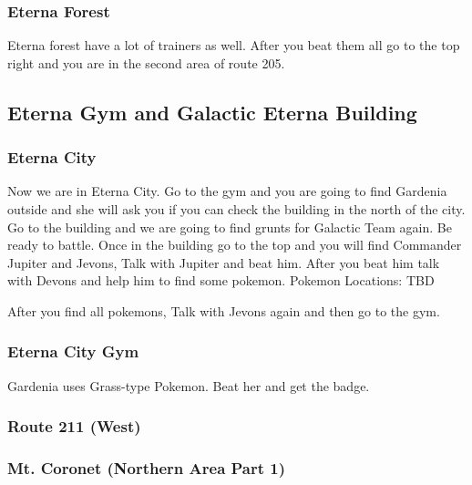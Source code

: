 \documentclass[11pt]{article}
\begin{document}




\subsubsection{Eterna Forest}\label{subsubsec:eterna_forest}
Eterna forest have a lot of trainers as well.
After you beat them all go to the top right and you are in the second area of route 205.





\subsection{Eterna Gym and Galactic Eterna Building}\label{subsec:eterna-gym}

\subsubsection{Eterna City}\label{subsubsec:eterna-city}
Now we are in Eterna City.
Go to the gym and you are going to find Gardenia outside and she will ask you
if you can check the building in the north of the city.
Go to the building and we are going to find grunts for Galactic Team again.
Be ready to battle.
Once in the building go to the top and you will find
Commander Jupiter and Jevons, Talk with Jupiter and beat him.
After you beat him talk with Devons and help him to find some pokemon.
Pokemon Locations: TBD

After you find all pokemons, Talk with Jevons again and then go to the gym.

\subsubsection{Eterna City Gym}\label{subsubsec:eterna-city-gym}
Gardenia uses Grass-type Pokemon.
Beat her and get the badge.

\subsubsection{Route 211 (West)}\label{subsubsec:route_211_(west)}



\subsubsection{Mt. Coronet (Northern Area Part 1)}\label{subsubsec:mt._coronet_north}
% 
\end{document}
